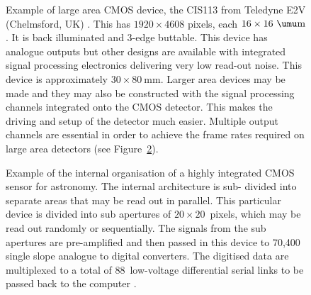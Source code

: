 \documentclass{pasa}%
\begin{document}
\begin{figure}
\centering
{}
 \caption{Example of large area CMOS device, the CIS113 from Teledyne E2V (Chelmsford, UK) \citep{Jorden+2014}.  This has $1920 \times 4608$ pixels, each $16 \times 16~\umu\mbox{m}$.  It is back illuminated and 3-edge buttable.  This device has analogue outputs but other designs are available %
 with integrated signal processing electronics delivering very low read-out noise.  This device is approximately $30 \times 80~\mbox{mm}$.  Larger area devices may be made and they may also be constructed with the signal processing channels integrated onto the CMOS detector. This makes the driving and setup of the detector much easier. Multiple output channels are essential in order to achieve the frame rates required on large area detectors (see Figure~\protect\ref{fig:CMOS_scheme}).}
\label{fig:CMOS}
\end{figure}

\begin{figure}
\centering
{}
 \caption{Example of the internal organisation of a highly integrated CMOS sensor for astronomy.  The internal architecture is sub- divided into separate areas that may be read out in parallel.  This particular device is divided into sub apertures of $20 \times 20$~pixels, which may be read out randomly or sequentially.  The signals from the sub apertures are pre-amplified and then passed in this device to 70,400 single slope analogue to digital converters.  The digitised data are multiplexed to a total of 88~low-voltage differential serial links to be passed back to the computer \citep{Downing+2014}.}
\label{fig:CMOS_scheme}
\end{figure}
\end{document}
